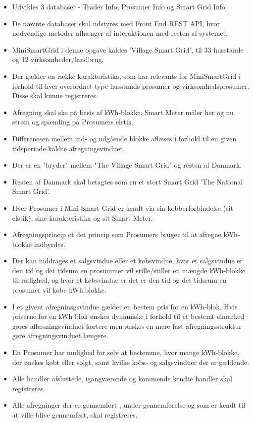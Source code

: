 \begin{itemize}
    \item Udvikles 3 databaser - Trader Info, Prosumer Info og Smart Grid Info.
    \item De nævnte databaser skal udstyres med Front End REST API, hvor nødvendige metoder afhænger af interaktionen med resten af systemet.
    \item MiniSmartGrid i denne opgave kaldes 'Village Smart Grid', til 33 husstande og 12 virksomheder/landbrug.
    \item Der gælder en række karakteristika, som har relevants for MiniSmartGrid i forhold til hver overordnet type husstands-prosumer og virksomhedsprosumer. Disse skal kunne registreres.
    \item Afregning skal ske på basis af kWh-blokke. Smart Meter måler her og nu strøm og spænding på Prosumers elstik.
    \item Differenesen mellem ind- og udgående blokke aflæses i forhold til en given tidsperiode kaldte afregningsvinduet.
    \item Der er en "bryder" mellem "The Village Smart Grid" og resten af Danmark. 
    \item Resten af Danmark skal  betagtes som en et stort Smart Grid 'The National Smart Grid'.
    \item Hver Prosumer i Mini Smart Grid er kendt via sin kobberforbindelse (sit elstik), sine karakteristika og sit Smart Meter.
    \item Afregningsprincip et det princip som Prosumers bruger til at afregne kWh-blokke indbyrdes.
    \item Der kan inddrages et salgsvindue eller et købsvindue, hvor et salgsvindue er den tid og det tidsum en prosummer vil stille/stiller en mængde kWh-blokke til rådighed, og hvor et købsvindue er det er den tid og det tidsrum en prosumer vil købe kWh.blokke.
    \item I et givent afregninsgsvindue gælder en bestem pris for en kWh-blok. Hvis priserne for en kWh-blok ønskes dynamiske i forhold til et bestemt elmarked gøres aflæsningsvinduet kortere men ønskes en mere fast afregningsstruktur gøre afregningsvinduet længere.
    \item En Prosumer har mulighed for selv at bestemme, hvor mange kWh-blokke, der ønskes købt eller solgt, samt hvilke købs- og salgsvinduer der er gældende.
    \item Alle handler afsluttede, igangværende og kommende kendte handler skal registreres.
    \item Alle afregninger der er gennemført , under gennemførelse og som er kendt til at ville blive gennemført, skal registreres.
\end{itemize}


